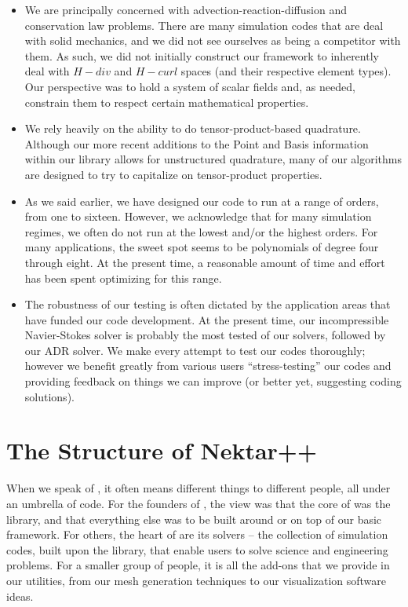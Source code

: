\begin{itemize}
\item We are principally concerned with advection-reaction-diffusion and conservation law problems.   There are many
simulation codes that are deal with solid mechanics, and we did not see ourselves as being a competitor with them.  As such,
we did not initially construct our framework to inherently deal with $H-div$ and $H-curl$ spaces (and their respective element types).
Our perspective was to hold a system of scalar fields and, as needed, constrain them to respect certain mathematical properties.  

\item We rely heavily on the ability to do tensor-product-based quadrature.  Although our more recent additions to the Point and Basis
information within our library allows for unstructured quadrature, many of our algorithms are designed to try to capitalize on
tensor-product properties.

\item As we said earlier, we have designed our code to run at a range of orders, from one to sixteen.  However, we acknowledge that 
for many simulation regimes, we often do not run at the lowest and/or the highest orders.  For many applications, the sweet spot seems
to be polynomials of degree four through eight.  At the present time, a reasonable amount of time and effort has been spent optimizing
for this range.

\item The robustness of our testing is often dictated by the application areas that have funded our code development.  At the present
time, our incompressible Navier-Stokes solver is probably the most tested of our solvers, followed by our ADR solver.  We make
every attempt to test our codes thoroughly; however we benefit greatly from various users ``stress-testing'' our codes and providing 
feedback on things we can improve (or better yet, suggesting coding solutions).
\end{itemize}



\section{The Structure of Nektar++}

When we speak of {\nek}, it often means different things to different people, all under an umbrella of code.  For the founders of {\nek}, 
the view was that the core of {\nek} was the library, and that everything else was to be built around or on top of our basic \shp{} framework.
For others, the heart of {\nek} are its solvers -- the collection of simulation codes, built upon the library, that enable users to solve
science and engineering problems.   For a smaller group of people, it is all the add-ons that we provide in our utilities, from our
mesh generation techniques to our visualization software ideas.   

